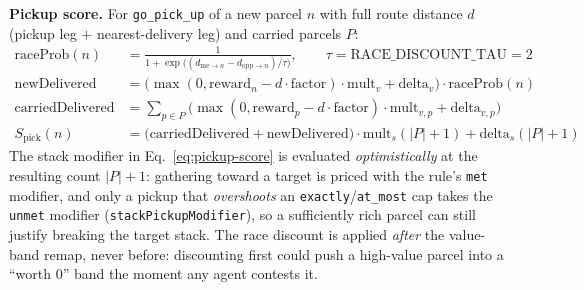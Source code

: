 \documentclass[11pt,a4paper]{article}
\renewcommand{\paragraph}[1]{\par\smallskip\noindent\textbf{#1}}
\begin{document}
\paragraph{Pickup score.} For \texttt{go\_pick\_up} of a new parcel $n$ with full route distance
$d$ (pickup leg $+$ nearest-delivery leg) and carried parcels $P$:
\begin{align}
\text{raceProb}(n) &= \frac{1}{1+\exp\!\big((d_{\text{me}\to n}-d_{\text{opp}\to n})/\tau\big)},
  \qquad \tau = \text{RACE\_DISCOUNT\_TAU} = 2
\label{eq:race-sigmoid} \\
\text{newDelivered} &= \Big(\max(0,\text{reward}_n - d\cdot\text{factor})\cdot\text{mult}_v+\text{delta}_v\Big)\cdot \text{raceProb}(n) \\
\text{carriedDelivered} &= \sum_{p\in P}\Big(\max(0,\text{reward}_p - d\cdot\text{factor})\cdot\text{mult}_{v,p}+\text{delta}_{v,p}\Big) \\
S_{\text{pick}}(n) &= \big(\text{carriedDelivered}+\text{newDelivered}\big)\cdot\text{mult}_{s}(|P|{+}1) + \text{delta}_{s}(|P|{+}1)
\label{eq:pickup-score}
\end{align}
The stack modifier in Eq.~\ref{eq:pickup-score} is evaluated \emph{optimistically} at the
resulting count $|P|{+}1$: gathering toward a target is priced with the rule's \texttt{met}
modifier, and only a pickup that \emph{overshoots} an \texttt{exactly}/\texttt{at\_most} cap
takes the \texttt{unmet} modifier (\texttt{stackPickupModifier}), so a sufficiently rich parcel
can still justify breaking the target stack. The race discount is applied \emph{after} the
value-band remap, never before: discounting first could push a high-value parcel into a
``worth 0'' band the moment any agent contests it.
\end{document}
